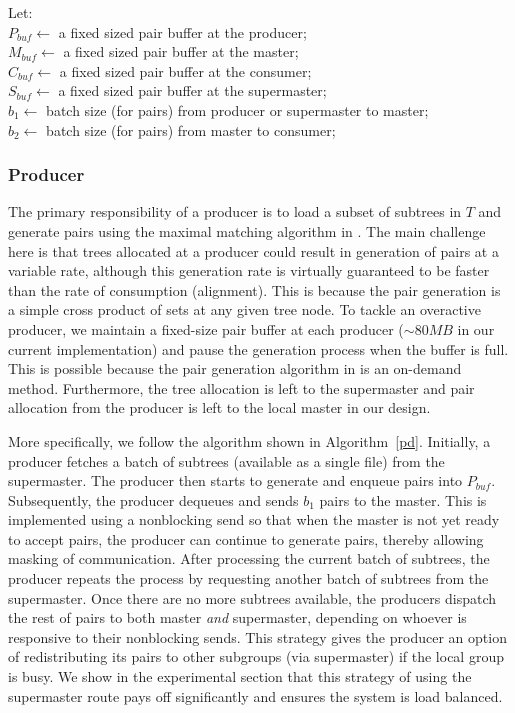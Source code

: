 \documentclass[10pt,journal,letterpaper,compsoc]{IEEEtran}
\begin{document}
Let:\\
$P_{buf}\leftarrow$ a fixed sized pair buffer at the producer;\\
$M_{buf}\leftarrow$ a fixed sized pair buffer at the master;\\
$C_{buf}\leftarrow$ a fixed sized pair buffer at the consumer;\\
$S_{buf}\leftarrow$ a fixed sized pair buffer at the supermaster;\\
$b_1\leftarrow$ batch size (for pairs) from producer or supermaster to master;\\
$b_2\leftarrow$ batch size (for pairs) from master to consumer;\\


\subsubsection{Producer}
\label{secProducer}

The primary responsibility of a producer is to load a subset of subtrees in $T$ and generate pairs using the maximal matching algorithm in \cite{KalyanaramanTPDS03}. The main challenge here is that trees allocated at a producer could result in generation of pairs at a variable rate, although this generation rate is virtually guaranteed to be faster than the rate of consumption (alignment). This is because the pair generation is a simple cross product of sets at any given tree node. To tackle an overactive producer, we maintain a fixed-size pair buffer at each producer ($\sim 80MB$ in our current implementation) and pause the generation process when the buffer is full. This is possible because the pair generation algorithm in \cite{KalyanaramanTPDS03} is an on-demand method. Furthermore, the tree allocation is left to the supermaster and pair allocation from the producer is left to the local master in our design. 

More specifically,  we follow the algorithm shown in Algorithm~\ref{pd}. Initially, a producer fetches a batch of subtrees (available as a single file) from the supermaster. The producer then starts to generate and enqueue pairs into $P_{buf}$. Subsequently, the producer dequeues and sends $b_1$ pairs to the master. This is implemented using a nonblocking send so that when the master is not yet ready to accept pairs, the producer can continue to generate pairs, thereby allowing masking of communication. After processing the current batch of subtrees, the producer repeats the process by requesting another batch of subtrees from the supermaster. Once there are no more subtrees available, the producers dispatch the rest of pairs to both master \emph{and} supermaster, depending on whoever is responsive to their nonblocking sends. This strategy gives the producer an option of redistributing its pairs to other subgroups (via supermaster) if the local group is busy. We show in the experimental section that this strategy of using the supermaster route pays off significantly and ensures the system is load balanced. \\
\end{document}
